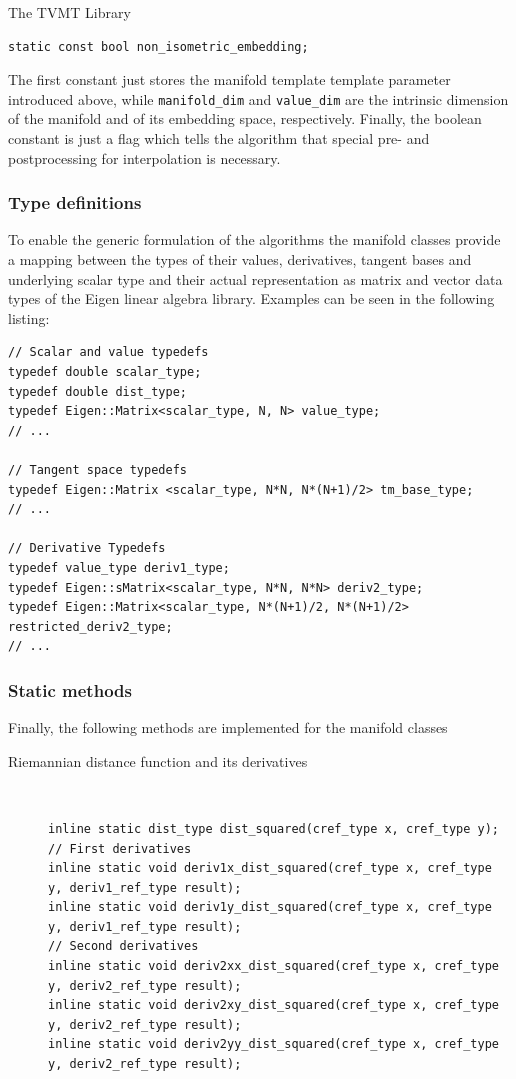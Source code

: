 \begin{chapter}{The TVMT Library}
\begin{lstlisting}
static const bool non_isometric_embedding;
\end{lstlisting}
The first constant just stores the manifold template template parameter introduced above, while \texttt{manifold\_dim} and \texttt{value\_dim} are the intrinsic dimension of the manifold
and of its embedding space, respectively. Finally, the boolean constant is just a flag which tells the algorithm that special pre- and postprocessing for interpolation is necessary.\\

\subsubsection{Type definitions} %
\label{ssub:Type definitions}
To enable the generic formulation of the algorithms the manifold classes provide a mapping between the types of their values, derivatives, tangent bases and underlying scalar type and their 
actual representation as matrix and vector data types of the Eigen linear algebra library. Examples can be seen in the following listing:

\cppinline
\begin{lstlisting}
// Scalar and value typedefs
typedef double scalar_type;
typedef double dist_type;
typedef Eigen::Matrix<scalar_type, N, N> value_type;
// ...

// Tangent space typedefs
typedef Eigen::Matrix <scalar_type, N*N, N*(N+1)/2> tm_base_type;
// ...

// Derivative Typedefs
typedef value_type deriv1_type;
typedef Eigen::sMatrix<scalar_type, N*N, N*N> deriv2_type;
typedef Eigen::Matrix<scalar_type, N*(N+1)/2, N*(N+1)/2> restricted_deriv2_type;
// ...
\end{lstlisting}

\subsubsection{Static methods} %
\label{ssub:Static methods}
Finally, the following methods are implemented for the manifold classes

\begin{description}
    
    \item[Riemannian distance function and its derivatives] \hfill \\
	\cppinline
	\begin{lstlisting}
inline static dist_type dist_squared(cref_type x, cref_type y);
// First derivatives	    
inline static void deriv1x_dist_squared(cref_type x, cref_type y, deriv1_ref_type result);
inline static void deriv1y_dist_squared(cref_type x, cref_type y, deriv1_ref_type result);
// Second derivatives
inline static void deriv2xx_dist_squared(cref_type x, cref_type y, deriv2_ref_type result);
inline static void deriv2xy_dist_squared(cref_type x, cref_type y, deriv2_ref_type result);
inline static void deriv2yy_dist_squared(cref_type x, cref_type y, deriv2_ref_type result);
	\end{lstlisting}
    

\end{description}
\end{chapter}
